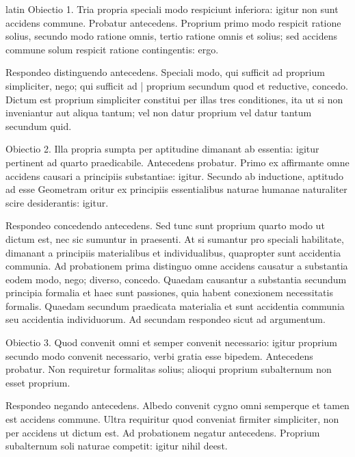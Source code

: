 \begin{otherlanguage*}{latin}
\pstart
Obiectio 1. Tria propria speciali modo respiciunt inferiora:
igitur non sunt accidens commune. Probatur antecedens. Proprium primo modo respicit ratione solius, secundo modo ratione omnis, tertio ratione omnis et solius; sed accidens commune solum respicit ratione contingentis:
ergo. 
\pend

\pstart
Respondeo distinguendo antecedens. Speciali modo, qui sufficit ad proprium simpliciter, nego; qui sufficit ad \textnormal{|} proprium secundum quod et reductive, concedo. Dictum est proprium simpliciter constitui per illas tres conditiones, ita ut si non inveniantur aut aliqua tantum; vel non datur proprium vel datur tantum secundum quid. 
\pend

\pstart
Obiectio 2. Illa propria sumpta per aptitudine dimanant ab essentia:
igitur pertinent ad quarto praedicabile. Antecedens probatur. Primo ex  affirmante omne accidens causari a principiis substantiae:
igitur. Secundo ab inductione, aptitudo ad esse Geometram oritur ex principiis essentialibus naturae humanae naturaliter scire desiderantis:
igitur. 
\pend

\pstart
Respondeo concedendo antecedens. Sed tunc sunt proprium quarto modo ut dictum est, nec sic sumuntur in praesenti. At si sumantur pro speciali habilitate, dimanant a principiis materialibus et individualibus, quapropter sunt accidentia communia. Ad probationem prima distinguo omne accidens causatur a substantia eodem modo, nego; diverso, concedo. Quaedam causantur a substantia secundum principia formalia et haec sunt passiones, quia habent conexionem necessitatis formalis. Quaedam secundum praedicata materialia et sunt accidentia communia seu accidentia individuorum. Ad secundam respondeo sicut ad argumentum. 
\pend

\pstart
Obiectio 3. Quod convenit omni et semper convenit necessario:
igitur proprium secundo modo convenit necessario, verbi gratia esse bipedem. Antecedens probatur. Non requiretur formalitas solius; alioqui proprium subalternum non esset proprium. 
\pend

\pstart
Respondeo negando antecedens. Albedo convenit cygno omni semperque et tamen est accidens commune. Ultra requiritur quod conveniat firmiter simpliciter, non per accidens ut dictum est. Ad probationem negatur antecedens. Proprium subalternum soli naturae competit:
igitur nihil deest. 
\pend


\end{otherlanguage*}
